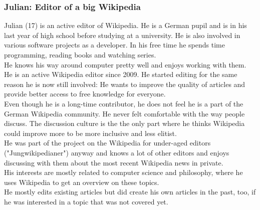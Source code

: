 \documentclass[11pt]{article}
\begin{document}
\subsubsection{Julian: Editor of a big Wikipedia}
Julian (17) is an active editor of Wikipedia. He is a German pupil and is in his last year of high school before studying at a university. He is also involved in various software projects as a developer. In his free time he spends time programming, reading books and watching series. \\
He knows his way around computer pretty well and enjoys working with them. \\
He is an active Wikipedia editor since 2009. He started editing for the same reason he is now still involved: He wants to improve the quality of articles and provide better access to free knowledge for everyone. \\
Even though he is a long-time contributor, he does not feel he is a part of the German Wikipedia community. He never felt comfortable with the way people discuss. The discussion culture is the the only part where he thinks Wikipedia could improve more to be more inclusive and less elitist. \\
He was part of the project on the Wikipedia for under-aged editors ("Jungwikipedianer") anyway and knows a lot of other editors and enjoys discussing with them about the most recent Wikipedia news in private. \\
His interests are mostly related to computer science and philosophy, where he uses Wikipedia to get an overview on these topics. \\
He mostly edits existing articles but did create his own articles in the past, too, if he was interested in a topic that was not covered yet.
\end{document}
